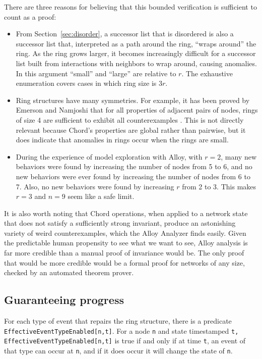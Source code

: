 \documentclass[conference]{IEEEtran}
\begin{document}
There are three reasons for believing that this bounded verification
is sufficient to count as a proof:
\begin{itemize}
\item
From Section~\ref{sec:disorder}, a successor list that is disordered
is also a successor list that, interpreted as a path around the ring,
``wraps around'' the ring.
As the ring grows larger, it becomes increasingly difficult for a
successor list built from interactions with neighbors to wrap around,
causing anomalies.
In this argument ``small'' and ``large'' are relative to $r$.
The exhaustive enumeration covers cases in which ring size is
$3r$.
\item
Ring structures have many symmetries.
For example, it has been proved by Emerson and Namjoshi that for all
properties of adjacent pairs of nodes, rings of size 4 are sufficient
to exhibit all counterexamples \cite{cutoff}.
This is not directly relevant because Chord's properties are global
rather than pairwise, but it does indicate that anomalies in rings 
occur when the rings are small.
\item
During the experience of model exploration with Alloy,
with $r = 2$,
many new behaviors were found
by increasing the number of nodes from 5 to 6, and no new behaviors were
ever found by increasing the number of nodes from 6 to 7.
Also, no new behaviors were found by increasing $r$ from 2 to 3.
This makes $r = 3$ and $n = 9$ seem like a safe limit.
\end{itemize}

It is also worth noting that Chord operations, when applied to a network
state that does not satisfy a sufficiently strong invariant, produce 
an astonishing variety of weird counterexamples, which the Alloy
Analyzer finds easily.
Given the predictable human
propensity to see what we want to see, Alloy analysis
is far more credible than a manual proof of invariance would be.
The only proof that would be more credible would be a formal proof
for networks of any size, checked by an automated theorem prover.

\subsection{Guaranteeing progress}

For each type of event that repairs the ring structure,
there is a predicate
\small
{\tt EffectiveEventTypeEnabled[n,t]}.
\normalsize
For a node 
\small
{\tt n}
\normalsize
and state timestamped
\small
{\tt t, EffectiveEventTypeEnabled[n,t]} 
\normalsize
is true if and only if at time
\small
{\tt t},
\normalsize
an event of that type can occur at 
\small
{\tt n},
\normalsize
and if it does occur
it will change the state of
\small
{\tt n}.
\normalsize
\end{document}
